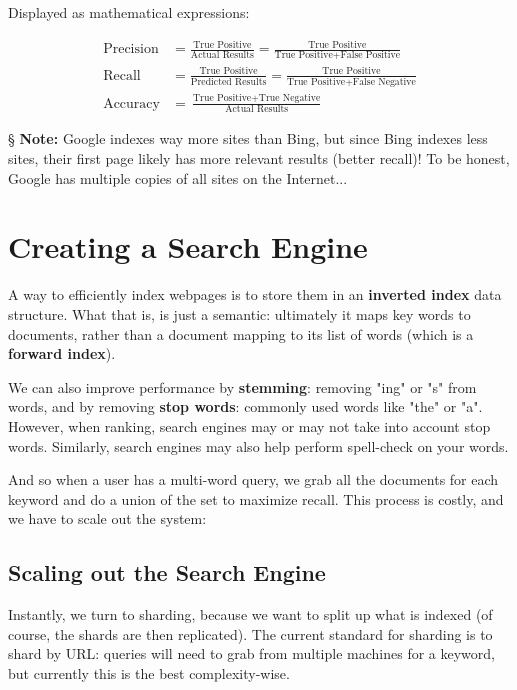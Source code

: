 \documentclass{report}
\newcommand{\npar}{\par\noindent}
\newcommand{\vpar}{\vspace{1em}\npar}
\newcommand{\nnote}{\npar \S \textbf{ Note: }}
\begin{document}
\npar Displayed as mathematical expressions:

\begin{align*}
    \text{Precision} &= \frac{\text{True Positive}}{\text{Actual Results}} = \frac{\text{True Positive}}{\text{True Positive} + \text{False Positive}}
    \\[0.5em]
    \text{Recall} &= \frac{\text{True Positive}}{\text{Predicted Results}} = \frac{\text{True Positive}}{\text{True Positive} + \text{False Negative}}
    \\[0.5em]
    \text{Accuracy} &= \frac{\text{True Positive} + \text{True Negative}}{\text{Actual Results}}
\end{align*}

\nnote Google indexes way more sites than Bing, but since Bing indexes less sites, their first page likely has more relevant results (better recall)! To be honest, Google has multiple copies of all sites on the Internet...

\section{Creating a Search Engine}

\par A way to efficiently index webpages is to store them in an \textbf{inverted index} data structure. What that is, is just a semantic: ultimately it maps key words to documents, rather than a document mapping to its list of words (which is a \textbf{forward index}).

\vpar We can also improve performance by \textbf{stemming}: removing "ing" or "s" from words, and by removing \textbf{stop words}: commonly used words like "the" or "a". However, when ranking, search engines may or may not take into account stop words. Similarly, search engines may also help perform spell-check on your words.

\vpar And so when a user has a multi-word query, we grab all the documents for each keyword and do a union of the set to maximize recall. This process is costly, and we have to scale out the system:

\subsection{Scaling out the Search Engine}

\par Instantly, we turn to sharding, because we want to split up what is indexed (of course, the shards are then replicated). The current standard for sharding is to shard by URL: queries will need to grab from multiple machines for a keyword, but currently this is the best complexity-wise.
\end{document}
